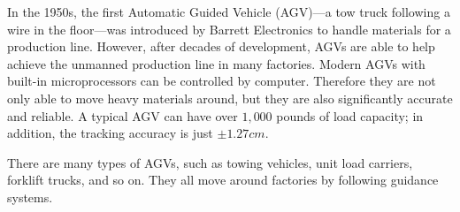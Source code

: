 \documentclass[letterpaper,12pt,oneside]{book}
\begin{document}
		
		In the 1950s, the first Automatic Guided Vehicle (AGV)—a tow truck following a wire in the floor—was introduced by Barrett Electronics to handle materials for a production line. \cite{olmi2011traffic} However, after decades of development, AGVs are able to help achieve the unmanned production line in many factories. Modern AGVs with built-in microprocessors can be controlled by computer. Therefore they are not only able to move heavy materials around, but they are also significantly accurate and reliable. A typical AGV can have over $1,000$ pounds of load capacity; in addition, the tracking accuracy is just $\pm 1.27 cm$. \cite{KESH} 
		
		There are many types of AGVs, such as towing vehicles, unit load carriers, forklift trucks, and so on. They all move around factories by following guidance systems.  
		
\end{document}
